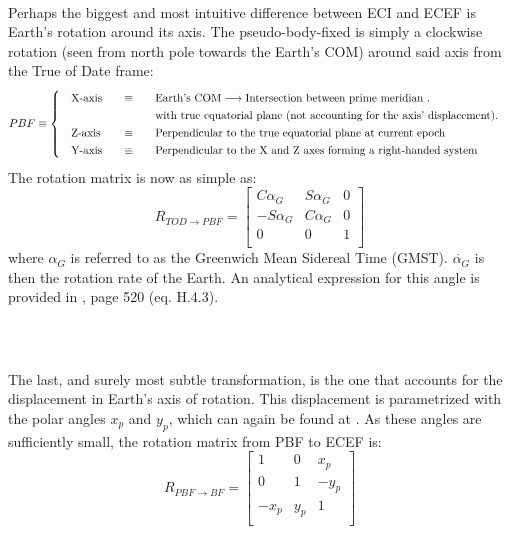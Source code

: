 		\subparagraph{\\}
		\indent Perhaps the biggest and most intuitive difference between ECI and ECEF is Earth's rotation around its axis. The pseudo-body-fixed is simply a clockwise rotation (seen from north pole towards the Earth's COM) around said axis from the True of Date frame:  \\
		\[
		\arraycolsep=10pt
		\def\arraystretch{1.3}
		PBF\equiv\left\{
		\begin{array}{lll}
		\text{X-axis} 	& \equiv 	& \text{Earth's COM} \longrightarrow \text{Intersection between prime meridian .} \\
		 				&  	 		& \text{with true equatorial plane (not accounting for the axis' displacement).} \\
		\text{Z-axis} 	& \equiv 	& \text{Perpendicular to the true equatorial plane at current epoch} \\
		\text{Y-axis} 	& \equiv 	& \text{Perpendicular to the X and Z axes forming a right-handed system} \\
		\end{array}
		\right.
		\]
		\indent The rotation matrix is now as simple as:
		\begin{equation}
		R_{TOD\rightarrow PBF} = 
		\left[ 
		\begin{array}{ccc}
		C \alpha_G 		& S\alpha_G 	& 0 \\
		-S\alpha_G 		& C\alpha_G 	& 0 \\
		0 				& 0 			& 1 \\
		\end{array}
		\right]
		\label{eq: R_TOD_PBF}
		\end{equation}
		\noindent where $\alpha_G$ is referred to as the Greenwich Mean Sidereal Time (GMST). $\dot{\alpha_G}$ is then the rotation rate of the Earth. An analytical expression for this angle is provided in \cite{Tapley}, page 520 (eq. H.4.3).
		\subparagraph{\\}
		\indent The last, and surely most subtle transformation, is the one that accounts for the displacement in Earth's axis of rotation. This displacement is parametrized with the polar angles $x_p$ and $y_p$, which can again be found at \cite{IERS_conventions}. As these angles are sufficiently small, the rotation matrix from PBF to ECEF is:\\
		\begin{equation}
		R_{PBF\rightarrow BF} = 
		\left[ 
		\begin{array}{ccc}
		1		& 0 	& x_p \\
		0 		& 1 	& -y_p \\
		-x_p 	& y_p 	& 1 \\
		\end{array}
		\right]
		\label{eq: R_PBF_ECEF}
		\end{equation}
